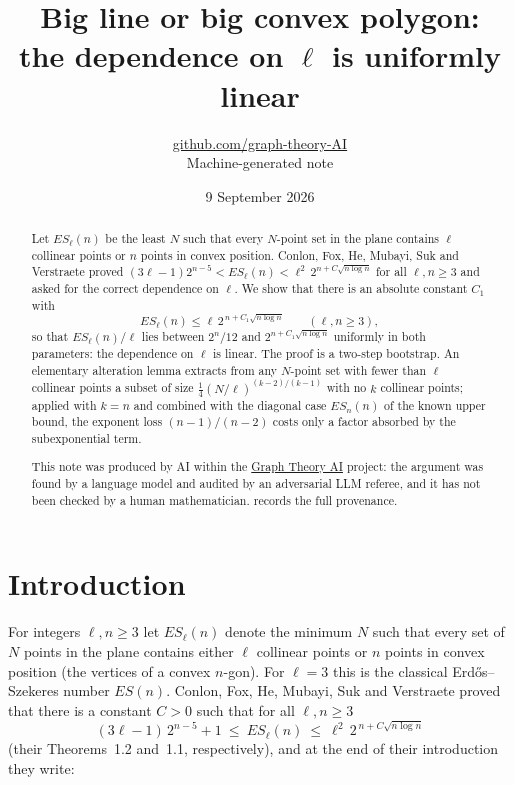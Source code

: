 \documentclass[11pt,a4paper]{article}
\title{Big line or big convex polygon:\\ the dependence on $\ell$ is uniformly linear}
\author{\href{https://github.com/graph-theory-AI}{github.com/graph-theory-AI}\\[2pt] \normalsize Machine-generated note}
\date{9 September 2026}
\theoremstyle{plain}
\theoremstyle{definition}
\theoremstyle{remark}
\newcommand{\ES}{\mathit{ES}}
\begin{document}
\maketitle


\begin{abstract}
Let $\ES_\ell(n)$ be the least $N$ such that every $N$-point set in the plane contains $\ell$ collinear points or $n$ points in convex position. Conlon, Fox, He, Mubayi, Suk and Verstraete proved $(3\ell-1)2^{n-5}<\ES_\ell(n)<\ell^2\,2^{n+C\sqrt{n\log n}}$ for all $\ell,n\ge3$ and asked for the correct dependence on $\ell$. We show that there is an absolute constant $C_1$ with
\[
 \ES_\ell(n)\le \ell\,2^{\,n+C_1\sqrt{n\log n}}\qquad(\ell,n\ge3),
\]
so that $\ES_\ell(n)/\ell$ lies between $2^n/12$ and $2^{n+C_1\sqrt{n\log n}}$ uniformly in both parameters: the dependence on $\ell$ is linear. The proof is a two-step bootstrap. An elementary alteration lemma extracts from any $N$-point set with fewer than $\ell$ collinear points a subset of size $\frac14(N/\ell)^{(k-2)/(k-1)}$ with no $k$ collinear points; applied with $k=n$ and combined with the diagonal case $\ES_n(n)$ of the known upper bound, the exponent loss $(n-1)/(n-2)$ costs only a factor absorbed by the subexponential term.

\medskip\noindent\small
This note was produced by AI within the \href{https://github.com/graph-theory-AI/Graph-Theory-LLM-Proofs}{Graph Theory AI} project:
the argument was found by a language model and audited by an adversarial LLM
referee, and it has not been checked by a human mathematician.
 records the full provenance.

\end{abstract}

\section{Introduction}

For integers $\ell,n\ge3$ let $\ES_\ell(n)$ denote the minimum $N$ such that every set of $N$ points in the plane contains either $\ell$ collinear points or $n$ points in convex position (the vertices of a convex $n$-gon). For $\ell=3$ this is the classical Erdős--Szekeres number $\ES(n)$. Conlon, Fox, He, Mubayi, Suk and Verstraete \cite{CFHMSV} proved that there is a constant $C>0$ such that for all $\ell,n\ge3$
\begin{equation}\label{eq:source}
 (3\ell-1)\,2^{n-5}+1\ \le\ \ES_\ell(n)\ \le\ \ell^2\,2^{\,n+C\sqrt{n\log n}}
\end{equation}
(their Theorems~1.2 and~1.1, respectively), and at the end of their introduction they write:
\end{document}
